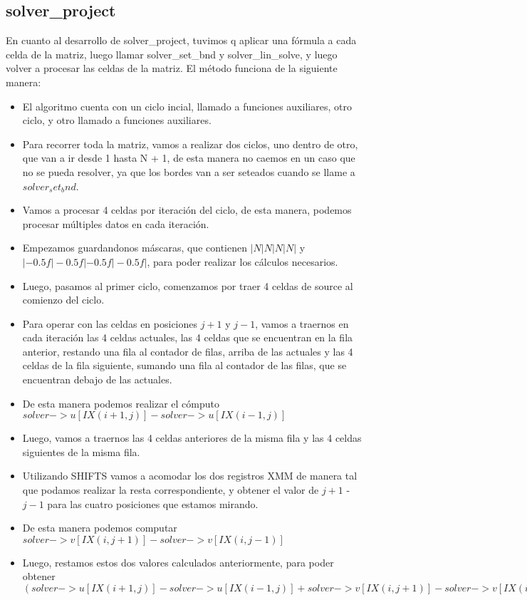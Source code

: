 \subsection{solver\_project}
En cuanto al desarrollo de solver\_project, tuvimos q aplicar una f\'ormula a cada celda de la matriz, luego llamar solver\_set\_bnd y solver\_lin\_solve, y luego volver a procesar las celdas de la matriz.
El m\'etodo funciona de la siguiente manera:

\begin{itemize}
\item El algoritmo cuenta con un ciclo incial, llamado a funciones auxiliares, otro ciclo, y otro llamado a funciones auxiliares.
\item Para recorrer toda la matriz, vamos a realizar dos ciclos, uno dentro de otro, que van a ir desde 1 hasta N + 1, de esta manera no caemos en un caso que no se pueda resolver, ya que los bordes van a ser seteados cuando se llame a $solver_set_bnd$.
\item Vamos a procesar 4 celdas por iteraci\'on del ciclo, de esta manera, podemos procesar m\'ultiples datos en cada iteraci\'on.
\item Empezamos guardandonos m\'ascaras, que contienen $|N|N|N|N|$ y $|-0.5f|-0.5f|-0.5f|-0.5f|$, para poder realizar los c\'alculos necesarios.
\item Luego, pasamos al primer ciclo, comenzamos por traer 4 celdas de source al comienzo del ciclo.
\item Para operar con las celdas en posiciones $j+1$ y $j-1$, vamos a traernos en cada iteraci\'on las 4 celdas actuales, las 4 celdas que se encuentran en la fila anterior, restando una fila al contador de filas, arriba de las actuales y las 4 celdas de la fila siguiente, sumando una fila al contador de las filas, que se encuentran debajo de las actuales.
\item De esta manera podemos realizar el c\'omputo $solver->u[IX(i+1,j)] - solver->u[IX(i-1,j)]$
\item Luego, vamos a traernos las 4 celdas anteriores de la misma fila y las 4 celdas siguientes de la misma fila.
\item Utilizando SHIFTS vamos a acomodar los dos registros XMM de manera tal que podamos realizar la resta correspondiente, y obtener el valor de $j+1$ - $j-1$ para las cuatro posiciones que estamos mirando.
\item De esta manera podemos computar $solver->v[IX(i,j+1)] - solver->v[IX(i,j-1)]$
\item Luego, restamos estos dos valores calculados anteriormente, para poder obtener $(solver->u[IX(i+1,j)] - solver->u[IX(i-1,j)] + solver->v[IX(i,j+1)] - solver->v[IX(i,j-1)])$

\end{itemize}
